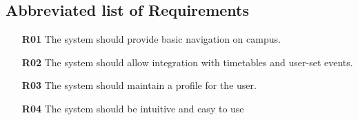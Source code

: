 \documentclass[12pt,a4paper]{article}
\begin{document}

		\subsection{Abbreviated list of Requirements}

			\begin{itemize}
				\item [\textbf{R01}] The system should provide basic navigation on campus.
				\item [\textbf{R02}] The system should allow integration with timetables and user-set events.
				\item [\textbf{R03}] The system should maintain a profile for the user.
				\item [\textbf{R04}] The system should be intuitive and easy to use
			\end{itemize}
\end{document}
